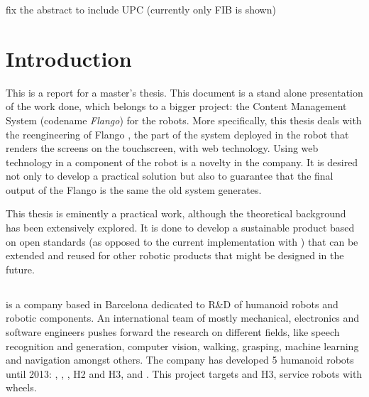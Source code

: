 
fix the abstract to include UPC (currently only FIB is shown)
\nocite{Stefanov} \nocite{Crockford} \nocite{Darwin} \nocite{AngularJSGuide} 

\chapter{Introduction}
This is a report for a master's thesis.
This document is a stand alone presentation of the work done, which belongs to a bigger project: the Content Management System (codename \textit{Flango}) for the robots.
More specifically, this thesis deals with the reengineering of Flango \cm , the part of the system deployed in the robot that renders the screens on the touchscreen, with web technology.
Using web technology in a component of the robot is a novelty in the company.
It is desired not only to develop a practical solution but also to guarantee that the final output of the Flango \cm is the same the old system generates.

This thesis is eminently a practical work, although the theoretical background has been extensively explored. 
It is done to develop a sustainable product based on open standards (as opposed to the current implementation with \flash) that can be extended and reused for other robotic products that might be designed in the future.

\section{\company}
\company is a company based in Barcelona dedicated to R\&D of humanoid robots and robotic components. 
An international team of mostly mechanical, electronics and software engineers pushes forward the research on different fields, like speech recognition and generation, computer vision, walking, grasping, machine learning and navigation amongst others.
The company has developed 5 humanoid robots until 2013: , , , H2 and H3, and .
This project targets  and H3, service robots with wheels.

